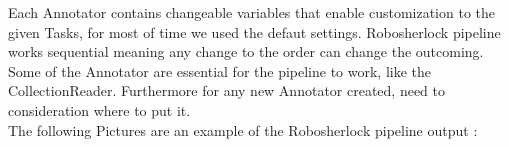 \documentclass[main.tex]{subfiles}
\begin{document}
Each Annotator contains  changeable variables that enable customization to the given Tasks, for most of time we used the defaut settings. 
Robosherlock pipeline works sequential meaning any change to the order can change the outcoming. Some of the Annotator are essential for the pipeline to work, like the CollectionReader. 
Furthermore for any new Annotator created, need to consideration where to put it.\\
 The following Pictures are an example of the Robosherlock pipeline output :  \\

\begin{figure}[H]
     \begin{center}
%
        \\ %
\end{center}
\end{figure}
\end{document}
